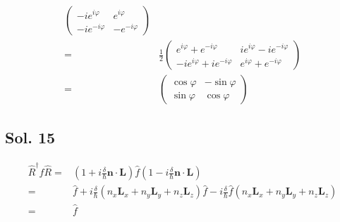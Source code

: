 \begin{enumerate}
\begin{align*}
\begin{pmatrix}
    -ie^{i\varphi} & e^{i\varphi}\\
    -ie^{-i\varphi} &-e^{-i\varphi}
\end{pmatrix}\\
=&\frac{1}{2}
\begin{pmatrix}
    e^{i\varphi}+e^{-i\varphi} & ie^{i\varphi}-ie^{-i\varphi}\\
    -ie^{i\varphi}+ie^{-i\varphi} & e^{i\varphi}+e^{-i\varphi}
\end{pmatrix}\\
    =&\begin{pmatrix}
        \cos\varphi & -\sin\varphi\\
         \sin\varphi& \cos\varphi
    \end{pmatrix}
\end{align*}
\end{enumerate}

\subsection*{Sol. 15}
\begin{align*}
    \hat R^\dagger \hat f \hat R
    =&(1+i\frac{\delta}{\hbar}\bm n\cdot \bm L)\hat f(1-i\frac{\delta}{\hbar}\bm n\cdot \bm L)\\
    =&\hat f+i\frac{\delta}{\hbar}(n_x\bm L_x+n_y\bm L_y+n_z\bm L_z)\hat f
    -i\frac{\delta}{\hbar}\hat f(n_x\bm L_x+n_y\bm L_y+n_z\bm L_z)\\
    =&\hat f
\end{align*}

